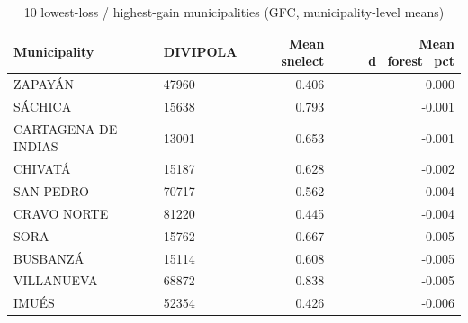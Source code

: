 \begin{table}

\caption{10 lowest-loss / highest-gain municipalities (GFC, municipality-level means)}
\centering
\begin{tabular}[t]{llrr}
\toprule
Municipality & DIVIPOLA & Mean snelect & Mean d\_forest\_pct\\
\midrule
ZAPAYÁN & 47960 & 0.406 & 0.000\\
SÁCHICA & 15638 & 0.793 & -0.001\\
CARTAGENA DE INDIAS & 13001 & 0.653 & -0.001\\
CHIVATÁ & 15187 & 0.628 & -0.002\\
SAN PEDRO & 70717 & 0.562 & -0.004\\
\addlinespace
CRAVO NORTE & 81220 & 0.445 & -0.004\\
SORA & 15762 & 0.667 & -0.005\\
BUSBANZÁ & 15114 & 0.608 & -0.005\\
VILLANUEVA & 68872 & 0.838 & -0.005\\
IMUÉS & 52354 & 0.426 & -0.006\\
\bottomrule
\end{tabular}
\end{table}
